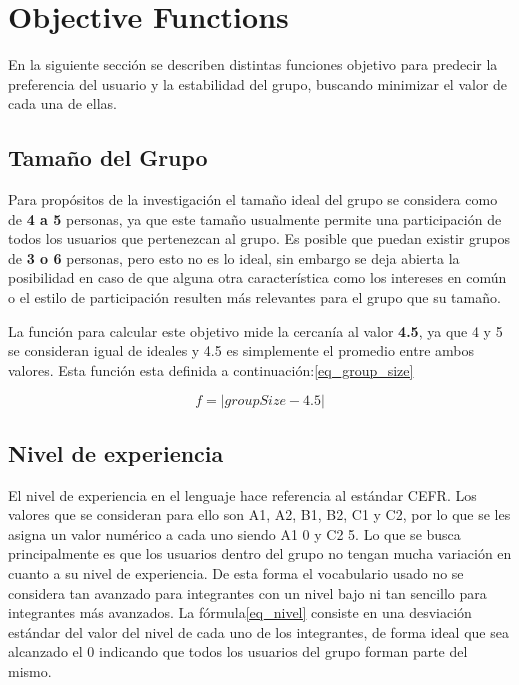\section{Objective Functions}

En la siguiente sección se describen distintas funciones objetivo para predecir la preferencia del usuario y la estabilidad del grupo, buscando minimizar el valor de cada una de ellas.

\subsection{Tamaño del Grupo}

Para propósitos de la investigación el tamaño ideal del grupo se considera como de \textbf{4 a 5} personas, ya que este tamaño usualmente permite una participación de todos los usuarios que pertenezcan al grupo. Es posible que puedan existir grupos de \textbf{3 o 6} personas, pero esto no es lo ideal, sin embargo se deja abierta la posibilidad en caso de que alguna otra característica como los intereses en común o el estilo de participación resulten más relevantes para el grupo que su tamaño.

La función para calcular este objetivo mide la cercanía al valor \textbf{4.5}, ya que 4 y 5 se consideran igual de ideales y 4.5 es simplemente el promedio entre ambos valores. Esta función esta definida a continuación:\ref{eq_group_size}

\begin{equation} \label{eq_group_size}
    f = | groupSize - 4.5|
\end{equation}

\subsection{Nivel de experiencia}

El nivel de experiencia en el lenguaje hace referencia al estándar CEFR\cite{}. Los valores que se consideran para ello son A1, A2, B1, B2, C1 y C2, por lo que se les asigna un valor numérico a cada uno siendo A1 0 y C2 5. Lo que se busca principalmente es que los usuarios dentro del grupo no tengan mucha variación en cuanto a su nivel de experiencia. De esta forma el vocabulario usado no se considera tan avanzado para integrantes con un nivel bajo ni tan sencillo para integrantes más avanzados. La fórmula\ref{eq_nivel} consiste en una desviación estándar del valor del nivel de cada uno de los integrantes, de forma ideal que sea alcanzado el 0 indicando que todos los usuarios del grupo forman parte del mismo.

